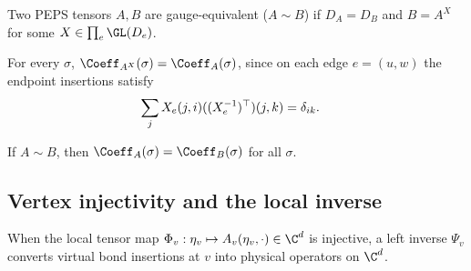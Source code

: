 \begin{definition}%
    \label{def:GaugeEquivPEPS}
    \leanok
    Two PEPS tensors $A,B$ are gauge-equivalent ($A\sim B$) if $D_A=D_B$ and
    $B=A^X$ for some $X\in\prod_e\GL(D_e)$.
\end{definition}

\begin{lemma}%
    \label{thm:applyGauge_stateCoeff}
    \leanok
    For every $\sigma$, $\Coeff_{A^X}(\sigma)=\Coeff_A(\sigma)$, since on each
    edge $e=(u,w)$ the endpoint insertions satisfy
    \begin{align}
        \sum_j X_e(j,i)((X_e^{-1})^\top)(j,k)
         & =\delta_{ik}.
        \notag
    \end{align}
\end{lemma}

\begin{lemma}%
    \label{thm:GaugeEquiv_sameState}
    \leanok
    If $A \sim B$, then $\Coeff_A(\sigma) = \Coeff_B(\sigma)$ for all $\sigma$.
\end{lemma}

\subsection{Vertex injectivity and the local inverse}

When the local tensor map $\Phi_v:\eta_v\mapsto A_v(\eta_v,\cdot)\in\C^d$ is
injective, a left inverse $\Psi_v$ converts virtual bond insertions at $v$ into
physical operators on $\C^d$.


